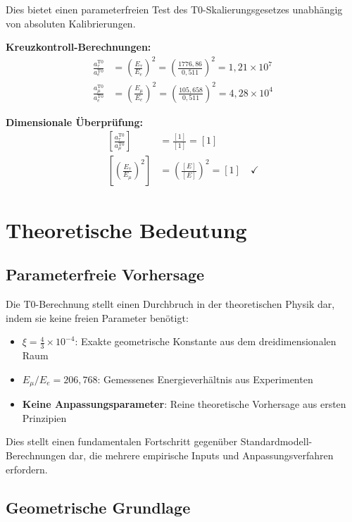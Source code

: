 \documentclass[12pt,a4paper]{report}
\begin{document}
	Dies bietet einen parameterfreien Test des T0-Skalierungsgesetzes unabhängig von absoluten Kalibrierungen.
	
	\textbf{Kreuzkontroll-Berechnungen:}
	\begin{align}
		\frac{a_\tau^{\text{T0}}}{a_e^{\text{T0}}} &= \left(\frac{E_\tau}{E_e}\right)^2 = \left(\frac{1776,86}{0,511}\right)^2 = 1,21 \times 10^{7} \\
		\frac{a_\mu^{\text{T0}}}{a_e^{\text{T0}}} &= \left(\frac{E_\mu}{E_e}\right)^2 = \left(\frac{105,658}{0,511}\right)^2 = 4,28 \times 10^{4}
	\end{align}
	
	\textbf{Dimensionale Überprüfung:}
	\begin{align}
		\left[\frac{a_\tau^{\text{T0}}}{a_\mu^{\text{T0}}}\right] &= \frac{[1]}{[1]} = [1] \\
		\left[\left(\frac{E_\tau}{E_\mu}\right)^2\right] &= \left(\frac{[E]}{[E]}\right)^2 = [1] \quad \checkmark
	\end{align}
	
	\section{Theoretische Bedeutung}
	\label{sec:theoretical_significance}
	
	\subsection{Parameterfreie Vorhersage}
	\label{subsec:parameter_free}
	
	Die T0-Berechnung stellt einen Durchbruch in der theoretischen Physik dar, indem sie keine freien Parameter benötigt:
	\begin{itemize}
		\item \textbf{$\xi = \frac{4}{3} \times 10^{-4}$}: Exakte geometrische Konstante aus dem dreidimensionalen Raum
		\item \textbf{$E_\mu/E_e = 206,768$}: Gemessenes Energieverhältnis aus Experimenten
		\item \textbf{Keine Anpassungsparameter}: Reine theoretische Vorhersage aus ersten Prinzipien
	\end{itemize}
	
	Dies stellt einen fundamentalen Fortschritt gegenüber Standardmodell-Berechnungen dar, die mehrere empirische Inputs und Anpassungsverfahren erfordern.
	
	\subsection{Geometrische Grundlage}
	\label{subsec:geometric_foundation}
	
\end{document}
